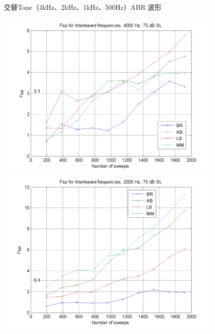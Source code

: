 \begin{figure}[H]
\begin{minipage}{0.48\textwidth}
    \end{minipage}
    \caption{交替Tone（4kHz、2kHz、1kHz、500Hz）ABR 波形}
    \label{fig:Interleaved75dbGHINOMA}
\end{figure}


\begin{figure}[H]
    \centering
    \begin{minipage}{0.48\textwidth}
        \includegraphics[width=\textwidth]{images/fspForInterleaved4000.png}
    \end{minipage}
    \hfill
    \begin{minipage}{0.48\textwidth}
        \includegraphics[width=\textwidth]{images/fspForInterleaved2000.png}
    \end{minipage}
    

\end{figure}
